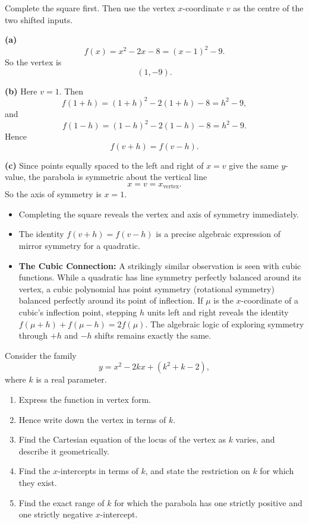 \begin{hint}
Complete the square first. Then use the vertex $x$-coordinate $v$ as the centre of the two shifted inputs.
\end{hint}

\begin{solution}
\textbf{(a)}
\[
f(x)=x^2-2x-8=(x-1)^2-9.
\]
So the vertex is
\[
\boxed{(1,-9).}
\]

\textbf{(b)} Here $v=1$. Then
\[
f(1+h)=(1+h)^2-2(1+h)-8=h^2-9,
\]
and
\[
f(1-h)=(1-h)^2-2(1-h)-8=h^2-9.
\]
Hence
\[
\boxed{f(v+h)=f(v-h).}
\]

\textbf{(c)} Since points equally spaced to the left and right of $x=v$ give the same $y$-value, the parabola is symmetric about the vertical line
\[
\boxed{x=v=x_{\text{vertex}}.}
\]
So the axis of symmetry is $x=1$.
\end{solution}

\begin{takeaways}
\begin{itemize}[leftmargin=*]
\item Completing the square reveals the vertex and axis of symmetry immediately.
\item The identity $f(v+h)=f(v-h)$ is a precise algebraic expression of mirror symmetry for a quadratic.
\item \textbf{The Cubic Connection:} A strikingly similar observation is seen with cubic functions. While a quadratic has line symmetry perfectly balanced around its vertex, a cubic polynomial has point symmetry (rotational symmetry) balanced perfectly around its point of inflection. If $\mu$ is the $x$-coordinate of a cubic's inflection point, stepping $h$ units left and right reveals the identity $f(\mu+h)+f(\mu-h)=2f(\mu)$. The algebraic logic of exploring symmetry through $+h$ and $-h$ shifts remains exactly the same.
\end{itemize}
\end{takeaways}


\begin{problem}
Consider the family
\[
y=x^2-2kx+(k^2+k-2),
\]
where $k$ is a real parameter.
\begin{enumerate}[label=(\alph*)]
\item Express the function in vertex form.
\item Hence write down the vertex in terms of $k$.
\item Find the Cartesian equation of the locus of the vertex as $k$ varies, and describe it geometrically.
\item Find the $x$-intercepts in terms of $k$, and state the restriction on $k$ for which they exist.
\item Find the exact range of $k$ for which the parabola has one strictly positive and one strictly negative $x$-intercept.
\end{enumerate}
\end{problem}

